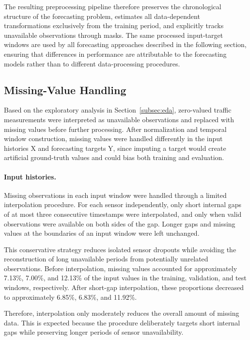 The resulting preprocessing pipeline therefore preserves the chronological
structure of the forecasting problem, estimates all data-dependent
transformations exclusively from the training period, and explicitly tracks
unavailable observations through masks. The same processed input-target
windows are used by all forecasting approaches described in the following
section, ensuring that differences in performance are attributable to the
forecasting models rather than to different data-processing procedures.


\subsection{Missing-Value Handling}
\label{subsec:missing}

Based on the exploratory analysis in
Section~\ref{subsec:eda}, zero-valued traffic measurements were interpreted
as unavailable observations and replaced with missing values before further
processing.
After normalization and temporal window construction, missing values were
handled differently in the input histories X and forecasting targets Y,
since imputing a target would create
artificial ground-truth values and could bias both training and evaluation.

\paragraph{Input histories.}

Missing observations in each input window were handled through a limited interpolation procedure.
For each sensor independently, only short
internal gaps of at most three consecutive timestamps were interpolated, and
only when valid observations were available on both sides of the gap. Longer
gaps and missing values at the boundaries of an input window were left
unchanged.

This conservative strategy reduces isolated sensor dropouts while avoiding
the reconstruction of long unavailable periods from potentially unrelated
observations. Before interpolation, missing values accounted for
approximately 7.13\%, 7.00\%, and 12.13\% of the input values in the
training, validation, and test windows, respectively. After short-gap
interpolation, these proportions decreased to approximately 6.85\%, 6.83\%,
and 11.92\%.

Therefore, interpolation only
moderately reduces the overall amount of missing data. This is expected
because the procedure deliberately targets short internal gaps while
preserving longer periods of sensor unavailability.

